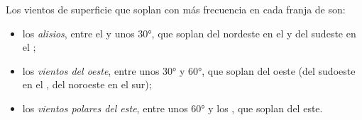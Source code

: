 \begin{definition}\label{def:g8:winds-global-circulation:global-winds}
Los vientos de superficie que soplan con más frecuencia en cada franja de
 son:
\begin{itemize}
  \item los \emph{alisios}, entre el  y unos
        \ang{30}, que soplan del nordeste en el  y del
        sudeste en el ;
  \item los \emph{vientos del oeste}, entre unos
        \ang{30} y \ang{60}, que soplan del oeste (del sudoeste en el
        , del noroeste en el sur);
  \item los \emph{vientos polares del este},
        entre unos \ang{60} y los , que soplan del este.
\end{itemize}
\end{definition}

